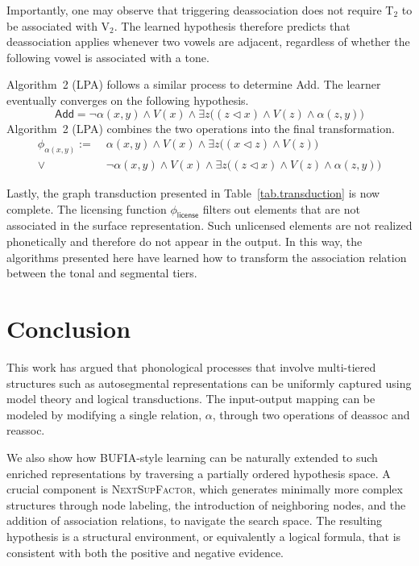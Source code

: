 \documentclass[pmlr]{jmlr}%
\newcommand{\hijeff}[1]{%
	\textcolor{violet}{\textbf{[#1]}}%
}
\newcommand{\hihan}[1]{%
	\textcolor{orange}{\textbf{[#1]}}%
}
\begin{document}
	Importantly, one may observe that triggering deassociation does not
	require T$_2$ to be associated with V$_2$. The learned hypothesis
	therefore predicts that deassociation applies whenever two vowels are
	adjacent, regardless of whether the following vowel is associated with
	a tone. %
	
	Algorithm~2 (LPA) follows a similar process to determine \textsf{Add}.
	The learner eventually converges on the following hypothesis.
	\begin{equation}
		\textsf{Add} 
		=
		\neg \alpha(x,y) \land V(x) \land \exists z \big((z \lhd x) \land V(z) \land \alpha (z,y)\big)
	\end{equation}
	Algorithm~2 (LPA) combines the two operations into the final transformation.
	\begin{align}
		\phi_{\alpha(x,y)} :=\;&
		\alpha(x,y)\land V(x)
		\land \exists z\big((x\lhd z)\land V(z)\big)
		\\\nonumber
		\lor\; &
		\neg\alpha(x,y)\land V(x)
		\land \exists z\big((z\lhd x)\land V(z)\land \alpha(z,y)\big)
	\end{align}
	
	Lastly, the graph transduction presented in Table~\ref{tab.transduction} is now complete. 
	The licensing function \(\phi_{\textsf{license}}\) filters
	out elements that are not associated in the surface representation.
	Such unlicensed elements are not realized phonetically and therefore
	do not appear in the output. In this way, the algorithms presented here have learned how to transform the association relation between the tonal and segmental tiers.
	
	\vspace{-1ex}
	
	\section{Conclusion} 
	
	This work has argued that phonological processes that involve 
	multi-tiered structures such as autosegmental representations
	can be uniformly captured using model theory and logical transductions. 
	The input-output mapping can be modeled by modifying a single relation, 
	$\alpha$, through two operations of \textsf{deassoc} and 
	\textsf{reassoc}.
	
	We also show how BUFIA-style learning can be naturally extended to
	such enriched representations by traversing a partially ordered
	hypothesis space. A crucial component is \textsc{NextSupFactor},
	which generates minimally more complex structures through node
	labeling, the introduction of neighboring nodes, and the addition of
	association relations, to navigate the search space.
	The resulting hypothesis is a structural environment, or
	equivalently a logical formula, that is consistent with both the
	positive and negative evidence.
	
\end{document}
